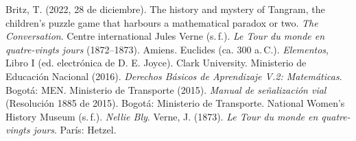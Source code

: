 \documentclass[11pt]{article}
\begin{document}
\autoevaluacion

\seguimientodocente

\begin{referencias}
 Britz, T. (2022, 28 de diciembre). The history and mystery of Tangram,
  the children's puzzle game that harbours a mathematical paradox or two. \emph{The Conversation}.
 Centre international Jules Verne (s.\,f.). \emph{Le Tour du monde en
  quatre-vingts jours} (1872--1873). Amiens.
 Euclides (ca. 300 a.\,C.). \emph{Elementos}, Libro I (ed. electrónica
  de D. E. Joyce). Clark University.
 Ministerio de Educación Nacional (2016). \emph{Derechos
  Básicos de Aprendizaje V.2: Matemáticas}. Bogotá: MEN.
 Ministerio de Transporte (2015). \emph{Manual de señalización
  vial} (Resolución 1885 de 2015). Bogotá: Ministerio de Transporte.
 National Women's History Museum (s.\,f.). \emph{Nellie Bly}.
 Verne, J. (1873). \emph{Le Tour du monde en quatre-vingts jours}.
  París: Hetzel.
\end{referencias}
\end{document}

